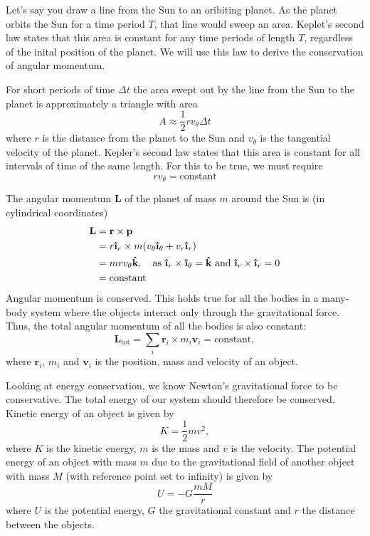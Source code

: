 \documentclass[reprint, english,notitlepage,nofootinbib]{revtex4-1}  %
\newcommand{\ihat}{\boldsymbol{\hat{\textbf{\i}}}}
\newcommand{\khat}{\boldsymbol{\hat{\textbf{k}}}}
\newcommand{\vc}[1]{\mathbf{#1}}
\begin{document}
Let's say you draw a line from the Sun to an oribiting planet. As the planet orbits the Sun for a time period $T$, that line would sweep an area. Keplet's second law states that this area is constant for any time periods of length $T$, regardless of the inital position of the planet. We will use this law to derive the conservation of angular momentum.

For short periods of time $\Delta t$ the area swept out by the line from the Sun to the planet is approximately a triangle with area
\begin{equation*}
  A \approx \frac{1}{2} r v_\theta \Delta t
\end{equation*}
where $r$ is the distance from the planet to the Sun and $v_\theta$ is the tangential velocity of the planet. Kepler's second law states that this area is constant for all intervals of time of the same length. For this to be true, we must require
\begin{equation*}
  r v_\theta = \text{constant}
\end{equation*}

The angular momentum $\vc L$ of the planet of mass $m$ around the Sun is (in cylindrical coordinates)
\begin{align*}
  \vc L &= \vc r \times \vc p \\
  &= r \ihat_r \times m(v_\theta \ihat_\theta + v_r \ihat_r) \\
  &= m r v_\theta \khat, \quad \text{as } \ihat_r \times \ihat_\theta = \khat \text{ and } \ihat_r \times \ihat_r = 0 \\
  &= \text{constant}
\end{align*}
Angular momentum is conserved. This holds true for all the bodies in a many-body system where the objects interact only through the gravitational force. Thus, the total angular momentum of all the bodies is also constant:
\begin{equation*}
  \vc L_{\text{tot}} = \sum_i \vc r_i \times m_i \vc v_i = \text{constant},
\end{equation*}
where $\vc r_i$, $m_i$ and $\vc v_i$ is the position, mass and velocity of an object.

Looking at energy conservation, we know Newton's gravitational force to be conservative. The total energy of our system should therefore be conserved. Kinetic energy of an object is given by
\begin{equation}
  \label{eq:kinetic_energy}
  K = \frac{1}{2}mv^2,
\end{equation}
where $K$ is the kinetic energy, $m$ is the mass and $v$ is the velocity. The potential energy of an object with mass $m$ due to the gravitational field of another object with mass $M$ (with reference point set to infinity) is given by
\begin{equation}
  \label{eq:potential_energy}
  U = - G \frac{m M}{r}
\end{equation}
where $U$ is the potential energy, $G$ the gravitational constant and $r$ the distance between the objects.
\end{document}
